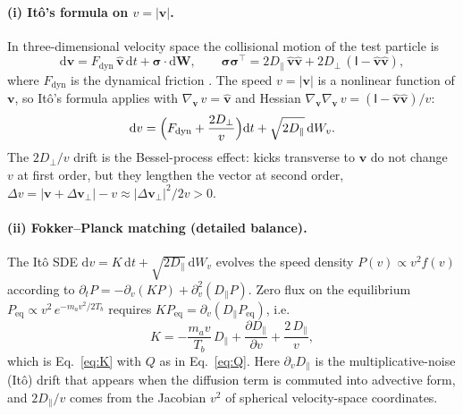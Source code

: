 \documentclass[11pt]{article}
\newcommand{\dd}{\mathrm{d}}
\begin{document}
\paragraph{(i) It\^o's formula on $v = |\bm{v}|$.}
In three-dimensional velocity space the collisional motion of the test
particle is
\begin{equation}
  \dd\bm{v} = F_{\mathrm{dyn}}\,\hat{\bm{v}}\,\dd t
            + \bm{\sigma}\cdot\dd\bm{W},
  \qquad
  \bm{\sigma}\bm{\sigma}^{\!\top}
  = 2D_{\parallel}\,\hat{\bm{v}}\hat{\bm{v}}
  + 2D_{\perp}\,(\mathsf{I}-\hat{\bm{v}}\hat{\bm{v}}),
\end{equation}
where $F_{\mathrm{dyn}}$ is the dynamical friction
\cite{chandrasekhar1943,trubnikov1965,helander2002}.  The speed
$v = |\bm{v}|$ is a nonlinear function of $\bm{v}$, so It\^o's formula
applies with $\nabla_{\!\bm v}\,v = \hat{\bm{v}}$ and Hessian
$\nabla_{\!\bm v}\nabla_{\!\bm v}\,v = (\mathsf{I}-\hat{\bm{v}}\hat{\bm{v}})/v$:
\begin{equation}
  \dd v = \Bigl(F_{\mathrm{dyn}} + \frac{2D_{\perp}}{v}\Bigr)\dd t
        + \sqrt{2D_{\parallel}}\,\dd W_v.
  \label{eq:ito_traj}
\end{equation}
The $2D_{\perp}/v$ drift is the Bessel-process effect: kicks transverse to
$\bm{v}$ do not change $v$ at first order, but they lengthen the vector at
second order, $\Delta v = |\bm{v}+\Delta\bm{v}_\perp| - v
\approx |\Delta\bm{v}_\perp|^2/2v > 0$.

\paragraph{(ii) Fokker--Planck matching (detailed balance).}
The It\^o SDE $\dd v = K\,\dd t + \sqrt{2D_{\parallel}}\,\dd W_v$ evolves
the speed density $P(v) \propto v^2 f(v)$ according to
$\partial_t P = -\partial_v(KP) + \partial_v^2(D_{\parallel}P)$.
Zero flux on the equilibrium
$P_{\mathrm{eq}} \propto v^2\,e^{-m_a v^2/2T_b}$ requires
$K P_{\mathrm{eq}} = \partial_v(D_{\parallel} P_{\mathrm{eq}})$, i.e.
\begin{equation}
  K = -\frac{m_a v}{T_b}\,D_{\parallel}
    + \frac{\partial D_{\parallel}}{\partial v}
    + \frac{2\,D_{\parallel}}{v},
\end{equation}
which is Eq.~\eqref{eq:K} with $Q$ as in Eq.~\eqref{eq:Q}.  Here
$\partial_v D_{\parallel}$ is the multiplicative-noise (It\^o) drift that
appears when the diffusion term is commuted into advective form, and
$2D_{\parallel}/v$ comes from the Jacobian $v^2$ of spherical
velocity-space coordinates.
\end{document}
